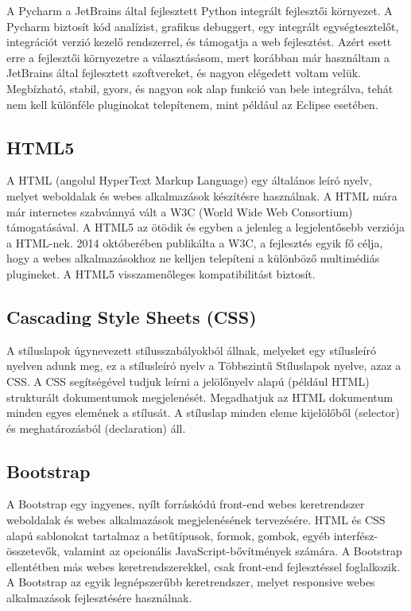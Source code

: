 A Pycharm a JetBrains által fejlesztett Python integrált fejlesztői környezet. A Pycharm biztosít kód analízist, grafikus debuggert, egy integrált egységtesztelőt, integrációt verzió kezelő rendszerrel, és támogatja a web fejlesztést.
Azért esett erre a fejlesztői környezetre a választásásom, mert korábban már használtam a JetBrains által fejlesztett szoftvereket, és nagyon elégedett voltam velük. Megbízható, stabil, gyors, és nagyon sok alap funkció van bele integrálva, tehát nem kell különféle pluginokat telepítenem, mint például az Eclipse esetében.

\subsection{HTML5}

A HTML (angolul HyperText Markup Language) egy általános leíró nyelv, melyet weboldalak és webes alkalmazások készítésre használnak. A HTML mára már internetes szabvánnyá vált a W3C (World Wide Web Consortium) támogatásával.
A HTML5 az ötödik és egyben a jelenleg a legjelentősebb verziója a HTML-nek. 2014 októberében publikálta a W3C, a fejlesztés egyik fő célja, hogy a webes alkalmazásokhoz ne kelljen telepíteni a különböző multimédiás plugineket. A HTML5 visszamenőleges kompatibilitást biztosít.

\subsection{Cascading Style Sheets (CSS)}

A stíluslapok úgynevezett stílusszabályokból állnak, melyeket egy stílusleíró nyelven adunk meg, ez a stílusleíró nyelv a Többszintű Stíluslapok nyelve, azaz a CSS. A CSS segítségével tudjuk leírni a jelölőnyelv alapú (például HTML) strukturált dokumentumok megjelenését. Megadhatjuk az HTML dokumentum minden egyes elemének a stílusát. A stíluslap minden eleme kijelölőből (selector) és meghatározásból (declaration) áll.

\subsection{Bootstrap}

A Bootstrap egy ingyenes, nyílt forráskódú front-end webes keretrendszer weboldalak és webes alkalmazások megjelenésének tervezésére. HTML és CSS alapú sablonokat tartalmaz a betűtípusok, formok, gombok, egyéb interfész-összetevők, valamint az opcionális JavaScript-bővítmények számára. A Bootstrap ellentétben más webes keretrendszerekkel, csak front-end fejlesztéssel foglalkozik. A Bootstrap az egyik legnépszerűbb keretrendszer, melyet responsive webes alkalmazások fejlesztésére használnak.

